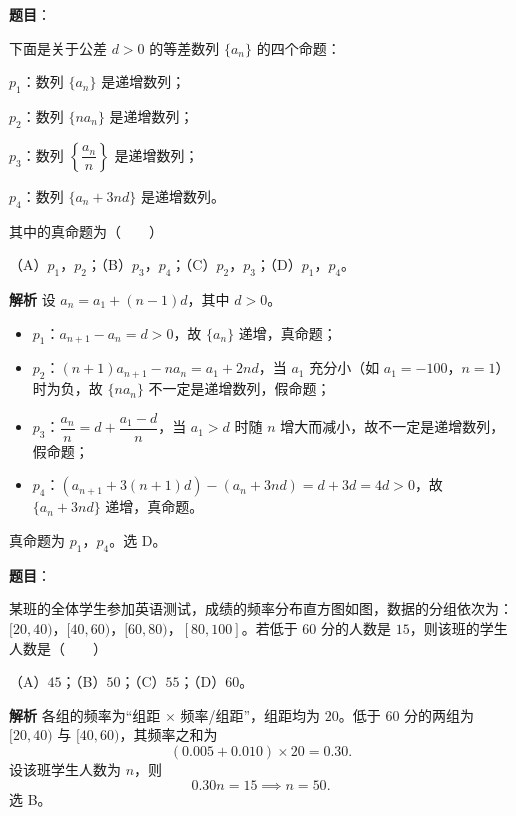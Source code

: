 \begin{answer}

\textbf{题目}：

下面是关于公差 $d>0$ 的等差数列 $\{a_n\}$ 的四个命题：

$p_1$：数列 $\{a_n\}$ 是递增数列；

$p_2$：数列 $\{na_n\}$ 是递增数列；

$p_3$：数列 $\left\{\dfrac{a_n}{n}\right\}$ 是递增数列；

$p_4$：数列 $\{a_n+3nd\}$ 是递增数列。

其中的真命题为\mbox{（　　）}

（A）$p_1$，$p_2$；（B）$p_3$，$p_4$；（C）$p_2$，$p_3$；（D）$p_1$，$p_4$。

\textbf{解析}
设 $a_n=a_1+(n-1)d$，其中 $d>0$。

\begin{itemize}
\item $p_1$：$a_{n+1}-a_n=d>0$，故 $\{a_n\}$ 递增，真命题；
\item $p_2$：$(n+1)a_{n+1}-na_n=a_1+2nd$，当 $a_1$ 充分小（如 $a_1=-100$，$n=1$）时为负，故 $\{na_n\}$ 不一定是递增数列，假命题；
\item $p_3$：$\dfrac{a_n}{n}=d+\dfrac{a_1-d}{n}$，当 $a_1>d$ 时随 $n$ 增大而减小，故不一定是递增数列，假命题；
\item $p_4$：$(a_{n+1}+3(n+1)d)-(a_n+3nd)=d+3d=4d>0$，故 $\{a_n+3nd\}$ 递增，真命题。
\end{itemize}

真命题为 $p_1$，$p_4$。选 D。


\end{answer}
\begin{answer}

\textbf{题目}：

某班的全体学生参加英语测试，成绩的频率分布直方图如图，数据的分组依次为：$[20,40)$，$[40,60)$，$[60,80)$，$[80,100]$。若低于 $60$ 分的人数是 $15$，则该班的学生人数是\mbox{（　　）}
\nopagebreak[4]
\begin{center}\end{center}
\nopagebreak[4]
（A）$45$；（B）$50$；（C）$55$；（D）$60$。

\textbf{解析}
各组的频率为“组距 $\times$ 频率/组距”，组距均为 $20$。低于 $60$ 分的两组为 $[20,40)$ 与 $[40,60)$，其频率之和为
\nopagebreak[4]
\[(0.005+0.010)\times20=0.30.\]
设该班学生人数为 $n$，则
\nopagebreak[4]
\[0.30n=15\implies n=50.\]
选 B。


\end{answer}
